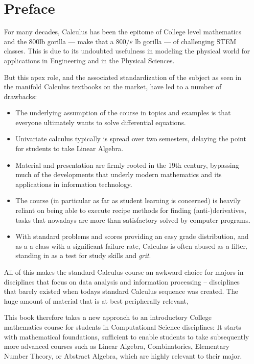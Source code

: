 \chapter{Preface}

For many decades, Calculus has been the epitome of College level
mathematics and the $800$lb gorilla --- make that a $800/\varepsilon$ lb
gorilla ---  of challenging STEM classes.
This is due to its undoubted usefulness in modeling the physical world for
applications in Engineering and in the Physical Sciences. 

But this apex role, and the associated standardization of the subject as seen
in the manifold Calculus textbooks on the market, have led to a number of
drawbacks:
\begin{itemize}
\item The underlying assumption of the course in topics and examples is
that everyone ultimately wants to solve differential equations.
\item Univariate calculus typically is spread over two semesters, delaying
the point for students to take Linear Algebra.
\item 
Material and presentation are firmly rooted in the 19th century, bypassing
much of the developments that underly modern mathematics and its applications
in information technology.
\item The course (in particular as far as student learning is concerned) is
heavily reliant on being able to execute recipe methods for finding
(anti-)derivatives, tasks that nowadays are more than satisfactory solved by
computer programs.
\item 
With standard problems and scores providing an easy grade distribution, and
as a a class with a significant failure rate, Calculus is often abused as a
filter, standing in as a test for study skills and {\em grit}.
\end{itemize}
All of this makes the standard Calculus course an awkward choice for majors
in disciplines that focus on data analysis and information processing --
disciplines that barely existed when todays standard Calculus sequence was
created. The huge amount of material that is at best peripherally relevant,
\medskip

This book therefore takes a new approach to an introductory College
mathematics course for students in Computational Science disciplines: It
starts with mathematical foundations, sufficient to enable students to take
subsequently
more advanced courses such as Linear Algebra, Combinatorics, Elementary
Number Theory, or Abstract Algebra, which are highly relevant to their major.

